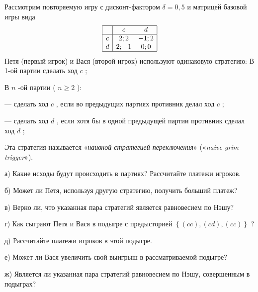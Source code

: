 \begin{problem}

Рассмотрим повторяемую игру с дисконт-фактором  $\delta =0,5$  и матрицей базовой игры вида
\[\begin{array}{|c|cc|}  \hline {} & {c} & {d} \\  \hline {c} & {2;2} & {-1;2} \\ {d} & {2;-1} & {0;0} \\  \hline  \end{array}\]
Петя (первый игрок) и Вася (второй игрок) используют одинаковую стратегию:
В 1-ой партии сделать ход  $c$ ;\par
В  $n$ -ой партии ( $n\ge 2$ ):\par
       — сделать ход  $c$ , если во  предыдущих партиях противник делал ход  $c$ ;\par
       — сделать ход  $d$ , если хотя бы в одной предыдущей партии противник сделал ход  $d$ ;\par
Эта стратегия называется «{\it наивной стратегией переключения}» («{\it naive grim trigger}»).\par
а) Какие исходы будут происходить в партиях? Рассчитайте платежи игроков.\par
б) Может ли Петя, используя другую стратегию, получить больший платеж?\par
в) Верно ли, что указанная пара стратегий является равновесием по Нэшу?\par
г) Как сыграют Петя и Вася в подыгре с предысторией  $\left\{\left(cc\right),\left(cd\right),\left(cc\right)\right\}$ ?\par
д) Рассчитайте платежи игроков в этой подыгре.\par
е) Может ли Вася увеличить свой выигрыш в рассматриваемой подыгре?\par
ж) Является ли указанная пара стратегий равновесием по Нэшу, совершенным в подыграх?



\begin{sol}

\end{sol}
\end{problem}



